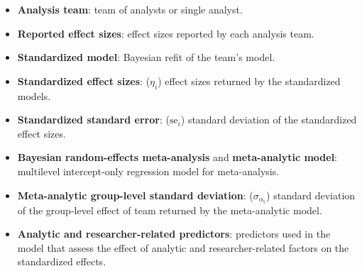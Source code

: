 \documentclass[Review,times,sageh]{sagej}
\providecommand{\tightlist}{\setlength{\itemsep}{0pt}\setlength{\parskip}{0pt}}
\begin{document}
\begin{itemize}
\tightlist
\item
  \textbf{Analysis team}: team of analysts or single analyst.
\item
  \textbf{Reported effect sizes}: effect sizes reported by each analysis
  team.
\item
  \textbf{Standardized model}: Bayesian refit of the team's model.
\item
  \textbf{Standardized effect sizes}: (\(\eta_i\)) effect sizes returned
  by the standardized models.
\item
  \textbf{Standardized standard error}: (\(\text{se}_i\)) standard
  deviation of the standardized effect sizes.
\item
  \textbf{Bayesian random-effects meta-analysis} and
  \textbf{meta-analytic model}: multilevel intercept-only regression
  model for meta-analysis.
\item
  \textbf{Meta-analytic group-level standard deviation}:
  (\(\sigma_{\alpha_{\text{t}}}\)) standard deviation of the group-level
  effect of team returned by the meta-analytic model.
\item
  \textbf{Analytic and researcher-related predictors}: predictors used
  in the model that assess the effect of analytic and researcher-related
  factors on the standardized effects.
\end{itemize}



\end{document}
